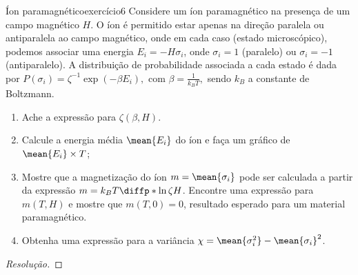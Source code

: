 \begin{exercício}{Íon paramagnético}{exercício6}
    Considere um íon paramagnético na presença de um campo magnético \(H\). O íon é permitido estar apenas na direção paralela ou antiparalela ao campo magnético, onde em cada caso (estado microscópico), podemos associar uma energia \(E_i = -H \sigma_i\), onde \(\sigma_i = 1\) (paralelo) ou \(\sigma_i = -1\) (antiparalelo). A distribuição de probabilidade associada a cada estado é dada por \(P(\sigma_i) = \zeta^{-1} \exp(-\beta E_i),\) com \(\beta = \frac{1}{k_BT},\) sendo \(k_B\) a constante de Boltzmann.
    \begin{enumerate}[label=(\alph*)]
        \item Ache a expressão para \(\zeta(\beta, H)\).
        \item Calcule a energia média \(\mean{E_i}\) do íon e faça um gráfico de \(\mean{E_i} \times T\);
        \item Mostre que a magnetização do íon \(m = \mean{\sigma_i}\) pode ser calculada a partir da expressão \(m = k_B T \diffp*{\ln \zeta}{H}\). Encontre uma expressão para \(m(T, H)\) e mostre que \(m(T, 0) = 0\), resultado esperado para um material paramagnético.
        \item Obtenha uma expressão para a variância \(\chi = \mean{\sigma_i^2} - \mean{\sigma_i}^2\).
    \end{enumerate}
\end{exercício}
\begin{proof}[Resolução]

\end{proof}
